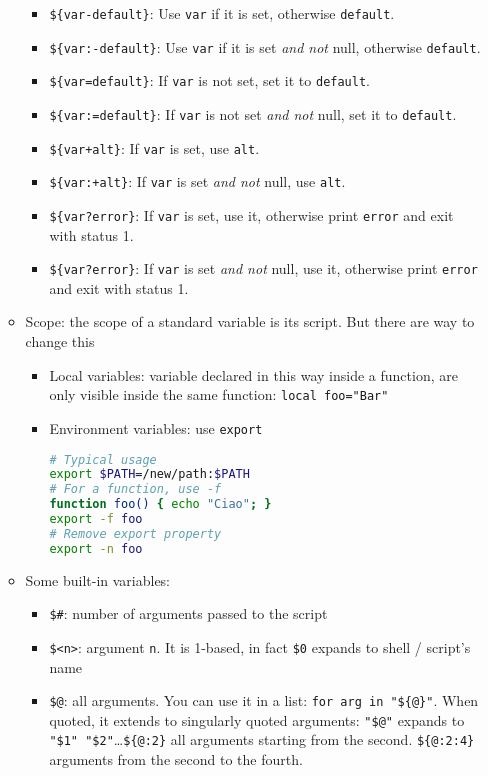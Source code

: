 \documentclass[a4paper,12pt,%
              final%
              ]{article}
\begin{document}
\begin{itemize}
\begin{itemize}
\begin{itemize}
          \item \verb|${var-default}|: Use \texttt{var} if it is set, otherwise \texttt{default}.
          \item \verb|${var:-default}|: Use \texttt{var} if it is set \emph{and not} null, otherwise \texttt{default}.
          \item \verb|${var=default}|: If \texttt{var} is not set, set it to \texttt{default}.
          \item \verb|${var:=default}|: If \texttt{var} is not set \emph{and not} null, set it to \texttt{default}.
          \item \verb|${var+alt}|: If \texttt{var} is set, use \texttt{alt}.
          \item \verb|${var:+alt}|: If \texttt{var} is set \emph{and not} null, use \texttt{alt}.
          \item \verb|${var?error}|: If \texttt{var} is set, use it, otherwise print \texttt{error} and exit with status 1.
          \item \verb|${var?error}|: If \texttt{var} is set \emph{and not} null, use it, otherwise print \texttt{error} and exit with status 1.
        \end{itemize}
      \item Scope: the scope of a standard variable is its script. But there are way to change this
        \begin{itemize}
          \item Local variables: variable declared in this way inside a function, are only visible inside the same function: \verb|local foo="Bar"|
          \item Environment variables: use \texttt{export}
\begin{lstlisting}[language=bash]
# Typical usage
export $PATH=/new/path:$PATH
# For a function, use -f
function foo() { echo "Ciao"; }
export -f foo
# Remove export property
export -n foo
\end{lstlisting}
        \end{itemize}
      \item Some built-in variables:
        \begin{itemize}
          \item \verb|$#|: number of arguments passed to the script
          \item \verb|$<n>|: argument \texttt{n}. It is 1-based, in fact \verb|$0| expands to shell / script's name
          \item \verb|$@|: all arguments. You can use it in a list: \verb|for arg in "${@}"|. When quoted, it extends to singularly quoted arguments: \verb|"$@"| expands to \verb|"$1" "$2"|\ldots \verb|${@:2}| all arguments starting from the second. \verb|${@:2:4}| arguments from the second to the fourth.

\end{itemize}
\end{itemize}
\end{itemize}
\end{document}
